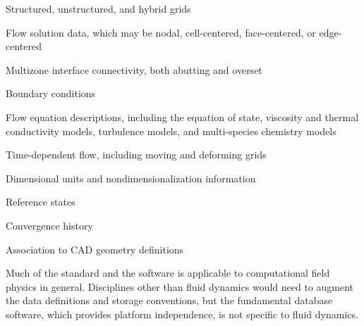 \begin{itemize*}
\item Structured, unstructured, and hybrid grids
\item Flow solution data, which may be nodal, cell-centered,
      face-centered, or edge-centered
\item Multizone interface connectivity, both abutting and overset
\item Boundary conditions
\item Flow equation descriptions, including the equation of state,
      viscosity and thermal conductivity models, turbulence models,
      and multi-species chemistry models
\item Time-dependent flow, including moving and deforming grids
\item Dimensional units and nondimensionalization information
\item Reference states
\item Convergence history
\item Association to CAD geometry definitions
\end{itemize*}

Much of the standard and the software is applicable to computational
field physics in general.
Disciplines other than fluid dynamics would need to augment the data
definitions and storage conventions, but the fundamental database
software, which provides platform independence, is not specific to fluid
dynamics.
